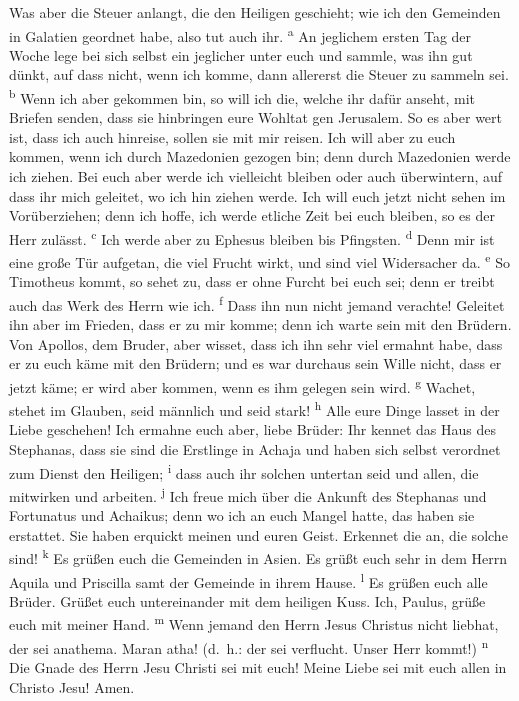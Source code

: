  Was aber die Steuer anlangt, die den Heiligen geschieht;
wie ich den Gemeinden in Galatien geordnet habe, also tut auch ihr.
\textsuperscript{a}  An jeglichem ersten Tag der Woche
lege bei sich selbst ein jeglicher unter euch und sammle, was ihn gut
dünkt, auf dass nicht, wenn ich komme, dann allererst die Steuer zu
sammeln sei. \textsuperscript{b}  Wenn ich aber gekommen
bin, so will ich die, welche ihr dafür anseht, mit Briefen senden, dass
sie hinbringen eure Wohltat gen Jerusalem.  So es aber
wert ist, dass ich auch hinreise, sollen sie mit mir reisen.
 Ich will aber zu euch kommen, wenn ich durch Mazedonien
gezogen bin; denn durch Mazedonien werde ich ziehen.  Bei
euch aber werde ich vielleicht bleiben oder auch überwintern, auf dass
ihr mich geleitet, wo ich hin ziehen werde.  Ich will euch
jetzt nicht sehen im Vorüberziehen; denn ich hoffe, ich werde etliche
Zeit bei euch bleiben, so es der Herr zulässt. \textsuperscript{c}
 Ich werde aber zu Ephesus bleiben bis Pfingsten.
\textsuperscript{d}  Denn mir ist eine große Tür aufgetan,
die viel Frucht wirkt, und sind viel Widersacher da. \textsuperscript{e}
 So Timotheus kommt, so sehet zu, dass er ohne Furcht bei
euch sei; denn er treibt auch das Werk des Herrn wie ich.
\textsuperscript{f}  Dass ihn nun nicht jemand verachte!
Geleitet ihn aber im Frieden, dass er zu mir komme; denn ich warte sein
mit den Brüdern.  Von Apollos, dem Bruder, aber wisset,
dass ich ihn sehr viel ermahnt habe, dass er zu euch käme mit den
Brüdern; und es war durchaus sein Wille nicht, dass er jetzt käme; er
wird aber kommen, wenn es ihm gelegen sein wird. \textsuperscript{g}
 Wachet, stehet im Glauben, seid männlich und seid stark!
\textsuperscript{h}  Alle eure Dinge lasset in der Liebe
geschehen!  Ich ermahne euch aber, liebe Brüder: Ihr
kennet das Haus des Stephanas, dass sie sind die Erstlinge in Achaja und
haben sich selbst verordnet zum Dienst den Heiligen; \textsuperscript{i}
 dass auch ihr solchen untertan seid und allen, die
mitwirken und arbeiten. \textsuperscript{j}  Ich freue
mich über die Ankunft des Stephanas und Fortunatus und Achaikus; denn wo
ich an euch Mangel hatte, das haben sie erstattet.  Sie
haben erquickt meinen und euren Geist. Erkennet die an, die solche sind!
\textsuperscript{k}  Es grüßen euch die Gemeinden in
Asien. Es grüßt euch sehr in dem Herrn Aquila und Priscilla samt der
Gemeinde in ihrem Hause. \textsuperscript{l}  Es grüßen
euch alle Brüder. Grüßet euch untereinander mit dem heiligen Kuss.
 Ich, Paulus, grüße euch mit meiner Hand.
\textsuperscript{m}  Wenn jemand den Herrn Jesus Christus
nicht liebhat, der sei anathema. Maran atha! (d.~h.: der sei verflucht.
Unser Herr kommt!) \textsuperscript{n}  Die Gnade des
Herrn Jesu Christi sei mit euch!  Meine Liebe sei mit
euch allen in Christo Jesu! Amen.
